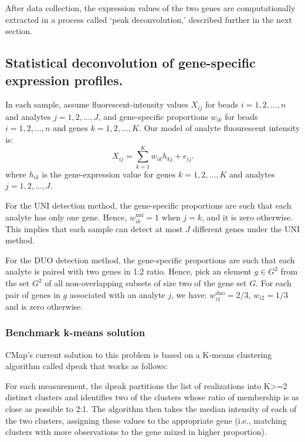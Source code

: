 \documentclass[]{article}
\begin{document}
After data collection, the expression values of the two genes are
computationally extracted in a process called `peak deconvolution,'
described further in the next section.

\hypertarget{statistical-deconvolution-of-gene-specific-expression-profiles.}{%
\subsection{Statistical deconvolution of gene-specific expression
profiles.}\label{statistical-deconvolution-of-gene-specific-expression-profiles.}}

In each sample, assume fluorescent-intensity values \(X_{ij}\) for beads
\(i=1,2,\dots, n\) and analytes \(j=1,2,\dots, J\), and gene-specific
proportions \(w_{ik}\) for beads \(i=1,2,\dots, n\) and genes
\(k=1,2,\dots, K\). Our model of analyte fluourescent intensity is: \[
  X_{ij} = \sum_{k=1}^{K} w_{ik} h_{kj} + e_{ij}. 
\] where \(h_{ik}\) is the gene-expression value for genes
\(k=1,2,\dots, K\) and analytes \(j=1,2,\dots, J\).

For the UNI detection method, the gene-specific proportions are such
that each analyte has only one gene. Hence, \(w^{\text{uni}}_{ik} = 1\)
when \(j = k\), and it is zero otherwise. This implies that each sample
can detect at most \(J\) different genes under the UNI method.

For the DUO detection method, the gene-specific proportions are such
that each analyte is paired with two genes in 1:2 ratio. Hence, pick an
element \(g\in G^2\) from the set \(G^2\) of all non-overlapping subsets
of size two of the gene set \(G\). For each pair of genes in \(g\)
associated with an analyte \(j\), we have:
\(w^{\text{duo}}_{i1} = 2/3\), \(w_{i2}=1/3\) and is zero otherwise.

\hypertarget{benchmark-k-means-solution}{%
\subsubsection{Benchmark k-means
solution}\label{benchmark-k-means-solution}}

CMap's current solution to this problem is based on a K-means clustering
algorithm called dpeak that works as follows:

For each measurement, the dpeak partitions the list of realizations into
K\textgreater=2 distinct clusters and identifies two of the clusters
whose ratio of membership is as close as possible to 2:1. The algorithm
then takes the median intensity of each of the two clusters, assigning
these values to the appropriate gene (i.e., matching clusters with more
observations to the gene mixed in higher proportion).
\end{document}
